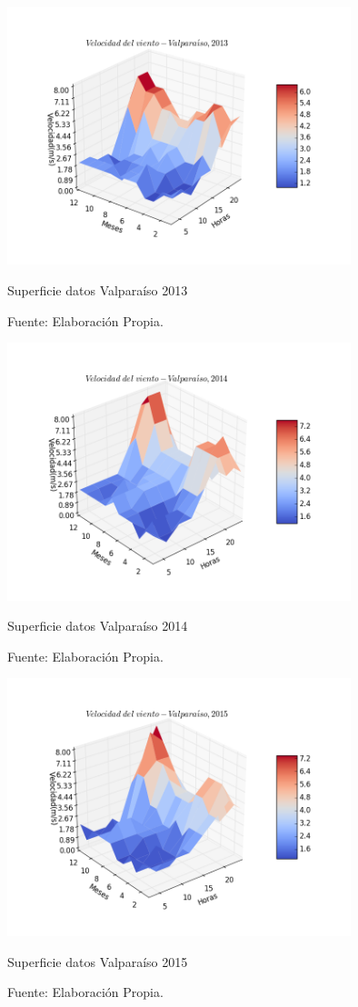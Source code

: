 \begin{figure}[h!]
    \centering
    \includegraphics[height=75mm]{figures/3d_data_2013.png}
    \caption{Superficie datos Valparaíso 2013}
    \vspace{-.25cm}
    \caption*{Fuente: Elaboración Propia.}
    \label{fig:data_valpo_13}
\end{figure}
\begin{figure}[h!]
    \centering
    \includegraphics[height=75mm]{figures/3d_data_2014.png}
    \caption{Superficie datos Valparaíso 2014}
    \vspace{-.25cm}
    \caption*{Fuente: Elaboración Propia.}
    \label{fig:data_valpo_14}
\end{figure}
\begin{figure}[h!]
    \centering
    \includegraphics[height=75mm]{figures/3d_data_2015.png}
    \caption{Superficie datos Valparaíso 2015}
    \vspace{-.25cm}
    \caption*{Fuente: Elaboración Propia.}
    \label{fig:data_valpo_15}
\end{figure}
